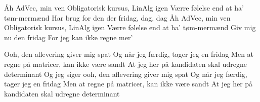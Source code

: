 \documentclass[a4paper,11pt]{article}
\begin{document}
\begin{song}
%
Åh AdVec, min ven
Obligatorisk kursus, LinAlg igen
Værre følelse end at ha' tøm-mermænd
Har brug for den der fridag, dag, dag
Åh AdVec, min ven
Obligatorisk kursus, LinAlg igen
Værre følelse end at ha' tøm-mermænd
Giv mig nu den fridag
For jeg kan ikke regne mer'

%
Ooh, den aflevering giver mig spat
Og når jeg færdig, tager jeg en fridag
Men at regne på matricer, kan ikke være sandt
At jeg her på kandidaten skal udregne determinant
Og jeg siger ooh, den aflevering giver mig spat
Og når jeg færdig, tager jeg en fridag
Men at regne på matricer, kan ikke være sandt
At jeg her på kandidaten skal udregne determinant
\end{song}
\end{document}
